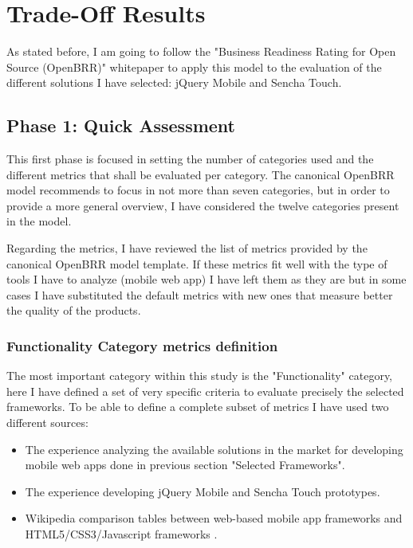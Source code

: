 \documentclass[a4paper,12pt]{book}
\begin{document}
\chapter{Trade-Off Results}
\label{chap:results}

As stated before, I am going to follow the "Business Readiness Rating for Open Source
(OpenBRR)" whitepaper\cite{OpenBRRWhitepaper} to apply this model to the evaluation of the different solutions I have selected: jQuery Mobile and Sencha Touch.

\section{Phase 1: Quick Assessment}
\label{sec:phase1}
This first phase is focused in setting the number of categories used and the different metrics that shall be evaluated per category. The canonical OpenBRR model recommends to focus in not more than seven categories, but in order to provide a more general overview, I have considered the twelve categories present in the model.

Regarding the metrics, I have reviewed the list of metrics provided by the canonical OpenBRR model template. If these metrics fit well with the type of tools I have to analyze (mobile web app) I have left them as they are but in some cases I have substituted the default metrics with new ones that measure better the quality of the products.

\subsection{Functionality Category metrics definition}
\label{Functionality Category metrics definition}

The most important category within this study is the "Functionality" category, here I have defined a set of very specific criteria to evaluate precisely the selected frameworks. To be able to define a complete subset of metrics I have used two different sources:

\begin{itemize}
 \item The experience analyzing the available solutions in the market for developing mobile web apps done in previous section "Selected Frameworks".
  \item The experience developing jQuery Mobile and Sencha Touch prototypes.
 \item Wikipedia comparison tables between web-based mobile app frameworks \cite{wikipedia1}  and HTML5/CSS3/Javascript frameworks \cite{wikipedia2}.
\end{itemize}
\end{document}
